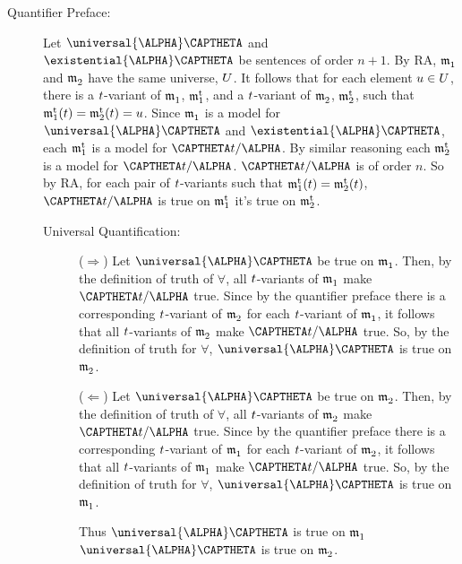 \begin{PROOF}
\begin{description}
\begin{description}
			\item[Quantifier Preface:] Let $\universal{\ALPHA}\CAPTHETA$ and $\existential{\ALPHA}\CAPTHETA$ be sentences of order $n+1$.
			By RA, $\mathfrak{m^{\mathrm{}}_{\mathrm{1}}}$ and $\mathfrak{m^{\mathrm{}}_{\mathrm{2}}}$ have the same universe, $U$.
			It follows that for each element $u\in U$, there is a $t$-variant of $\mathfrak{m^{\mathrm{}}_{\mathrm{1}}}$, $\mathfrak{m^{\mathrm{t}}_{\mathrm{1}}}$, and a $t$-variant of $\mathfrak{m^{\mathrm{}}_{\mathrm{2}}}$, $\mathfrak{m^{\mathrm{t}}_{\mathrm{2}}}$, such that $\mathfrak{m^{\mathrm{t}}_{\mathrm{1}}}(t)=\mathfrak{m^{\mathrm{t}}_{\mathrm{2}}}(t)=u$.
			Since $\mathfrak{m^{\mathrm{}}_{\mathrm{1}}}$ is a model for $\universal{\ALPHA}\CAPTHETA$ and $\existential{\ALPHA}\CAPTHETA$, each $\mathfrak{m^{\mathrm{t}}_{\mathrm{1}}}$ is a model for $\CAPTHETA\variable{t}/\ALPHA$.
			By similar reasoning each $\mathfrak{m^{\mathrm{t}}_{\mathrm{2}}}$ is a model for $\CAPTHETA\variable{t}/\ALPHA$.
			$\CAPTHETA\variable{t}/\ALPHA$ is of order $n$.
			So by RA, for each pair of $t$-variants such that $\mathfrak{m^{\mathrm{t}}_{\mathrm{1}}}(t)=\mathfrak{m^{\mathrm{t}}_{\mathrm{2}}}(t)$, $\CAPTHETA\variable{t}/\ALPHA$ is true on $\mathfrak{m^{\mathrm{t}}_{\mathrm{1}}}$ \Iff it's true on $\mathfrak{m^{\mathrm{t}}_{\mathrm{2}}}$.

			\begin{description}

				\item[Universal Quantification:] ($\Rightarrow$) Let $\universal{\ALPHA}\CAPTHETA$ be true on $\mathfrak{m^{\mathrm{}}_{\mathrm{1}}}$.
				Then, by the definition of truth of $\forall$, all $t$-variants of $\mathfrak{m^{\mathrm{}}_{\mathrm{1}}}$ make $\CAPTHETA\variable{t}/\ALPHA$ true.
				Since by the quantifier preface there is a corresponding $t$-variant of $\mathfrak{m^{\mathrm{}}_{\mathrm{2}}}$ for each $t$-variant of $\mathfrak{m^{\mathrm{}}_{\mathrm{1}}}$, it follows that all $t$-variants of $\mathfrak{m^{\mathrm{}}_{\mathrm{2}}}$ make $\CAPTHETA\variable{t}/\ALPHA$ true.
				So, by the definition of truth for $\forall$, $\universal{\ALPHA}\CAPTHETA$ is true on $\mathfrak{m^{\mathrm{}}_{\mathrm{2}}}$.

				($\Leftarrow$) Let $\universal{\ALPHA}\CAPTHETA$ be true on $\mathfrak{m^{\mathrm{}}_{\mathrm{2}}}$.
				Then, by the definition of truth of $\forall$, all $t$-variants of $\mathfrak{m^{\mathrm{}}_{\mathrm{2}}}$ make $\CAPTHETA\variable{t}/\ALPHA$ true.
				Since by the quantifier preface there is a corresponding $t$-variant of $\mathfrak{m^{\mathrm{}}_{\mathrm{1}}}$ for each $t$-variant of $\mathfrak{m^{\mathrm{}}_{\mathrm{2}}}$, it follows that all $t$-variants of $\mathfrak{m^{\mathrm{}}_{\mathrm{1}}}$ make $\CAPTHETA\variable{t}/\ALPHA$ true.
				So, by the definition of truth for $\forall$, $\universal{\ALPHA}\CAPTHETA$ is true on $\mathfrak{m^{\mathrm{}}_{\mathrm{1}}}$.

				Thus $\universal{\ALPHA}\CAPTHETA$ is true on $\mathfrak{m^{\mathrm{}}_{\mathrm{1}}}$ \Iff $\universal{\ALPHA}\CAPTHETA$ is true on $\mathfrak{m^{\mathrm{}}_{\mathrm{2}}}$.


\end{description}
\end{description}
\end{description}
\end{PROOF}
